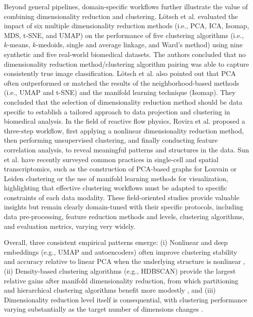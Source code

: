 \documentclass[preprint,12pt]{elsarticle}
\begin{document}
Beyond general pipelines, domain-specific workflows further illustrate the value of combining dimensionality reduction and clustering. Lötsch et al. \cite{loetsch2024comparative} evaluated the impact of six multiple dimensionality reduction methods (i.e., PCA, ICA, Isomap, MDS, t-SNE, and UMAP) on the performance of five clustering algorithms (i.e., $k$-means, $k$-medoids, single and average linkage, and Ward's method) using nine synthetic and five real-world biomedical datasets. The authors concluded that no dimensionality reduction method/clustering algorithm pairing was able to capture consistently true image classification. Lötsch et al. also pointed out that PCA often outperformed or matched the results of the neighborhood-based methods (i.e., UMAP and t-SNE) and the manifold learning technique (Isomap). They concluded that the selection of dimensionality reduction method should be data specific to establish a tailored approach to data projection and clustering in biomedical analysis. In the field of reactive flow physics, Rovira et al. \cite{rovira2022reactive} proposed a three-step workflow, first applying a nonlinear dimensionality reduction method, then performing unsupervised clustering, and finally conducting feature correlation analysis, to reveal meaningful patterns and structures in the data. Sun et al. \cite{sun2024genomics} have recently surveyed common practices in single-cell and spatial transcriptomics, such as the construction of PCA-based graphs for Louvain or Leiden clustering or the use of manifold learning methods for visualization, highlighting that effective clustering workflows must be adapted to specific constraints of each data modality. These field-oriented studies provide valuable insights but remain clearly domain-tuned with their specific protocols, including data pre-processing, feature reduction methods and levels, clustering algorithms, and evaluation metrics, varying very widely.

Overall, three consistent empirical patterns emerge: (i) Nonlinear and deep embeddings (e.g., UMAP and autoencoders) often improve clustering stability and accuracy relative to linear PCA when the underlying structure is nonlinear \cite{alkhayrat2020comparative,allaoui2020umap,dalmaijer2022power}, (ii) Density-based clustering algorithms (e.g., HDBSCAN) provide the largest relative gains after manifold dimensionality reduction, from which partitioning and hierarchical clustering algorithms benefit more modestly \cite{dalmaijer2022power,allaoui2020umap}, and (iii) Dimensionality reduction level itself is consequential, with clustering performance varying substantially as the target number of dimensions changes \cite{hozumi2021UMAP}. %
\end{document}
